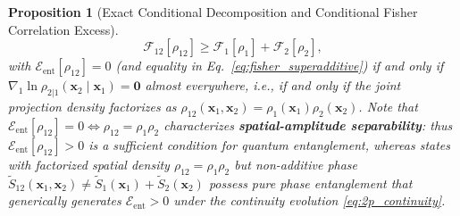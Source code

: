 \documentclass[11pt, a4paper]{article}
\newtheorem{proposition}[theorem]{Proposition}
\theoremstyle{definition}
\begin{document}
\begin{proposition}[Exact Conditional Decomposition and Conditional Fisher Correlation Excess]
\begin{equation}
\label{eq:fisher_superadditive}
\mathcal{F}_{12}[\rho_{12}] \ge \mathcal{F}_1[\rho_1] + \mathcal{F}_2[\rho_2],
\end{equation}
with $\mathcal{E}_{\text{ent}}[\rho_{12}] = 0$ (and equality in Eq.~\eqref{eq:fisher_superadditive}) if and only if $\nabla_1 \ln\rho_{2|1}(\mathbf{x}_2 \mid \mathbf{x}_1) = \mathbf{0}$ almost everywhere, i.e., if and only if the joint projection density factorizes as $\rho_{12}(\mathbf{x}_1, \mathbf{x}_2) = \rho_1(\mathbf{x}_1)\rho_2(\mathbf{x}_2)$. Note that $\mathcal{E}_{\text{ent}}[\rho_{12}] = 0 \iff \rho_{12} = \rho_1\rho_2$ characterizes \textbf{spatial-amplitude separability}: thus $\mathcal{E}_{\text{ent}}[\rho_{12}] > 0$ is a sufficient condition for quantum entanglement, whereas states with factorized spatial density $\rho_{12} = \rho_1\rho_2$ but non-additive phase $\tilde{S}_{12}(\mathbf{x}_1, \mathbf{x}_2) \neq \tilde{S}_1(\mathbf{x}_1) + \tilde{S}_2(\mathbf{x}_2)$ possess pure phase entanglement that generically generates $\mathcal{E}_{\text{ent}} > 0$ under the continuity evolution \eqref{eq:2p_continuity}.
\end{proposition}
\end{document}
